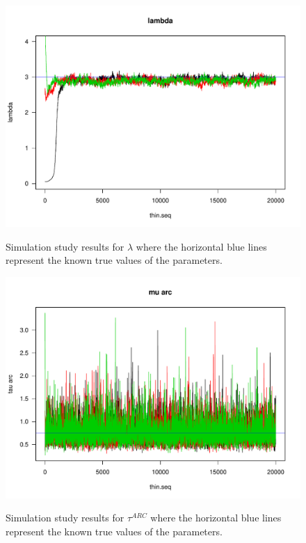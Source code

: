 \documentclass[11pt]{article}
\begin{document}
\begin{figure}[htbp]
\begin{center}
\caption{Simulation study results for $\lambda$ where the horizontal blue lines represent the known true values of the parameters.}
\includegraphics[width=6.0in]{fig__trace_lambda_sim.pdf}
\label{fig_sim_sum1}
\end{center}
\end{figure}



\begin{figure}[p]
\caption{Simulation study results for $\tau^{ARC}$ where the horizontal blue lines represent the known true values of the parameters.}
\begin{center}
\includegraphics[scale=0.7]{test.pdf}
\label{figure:figure1}
\end{center}
\end{figure}
\end{document}
